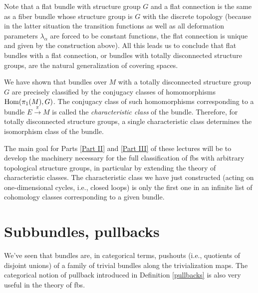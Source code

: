 \begin{example}
	Note that a flat bundle with structure group $G$ and a flat connection is the same as a fiber bundle whose structure group is $G$ with the discrete topology (because in the latter situation the transition functions as well as all deformation parameters $\lambda_\alpha$ are forced to be constant functions, the flat connection is unique and given by the construction above). All this leads us to conclude that flat bundles with a flat connection, or bundles with totally disconnected structure groups, are the natural generalization of covering spaces.
	
	We have shown that bundles over $M$ with a totally disconnected structure group $G$ are precisely classified by the conjugacy classes of homomorphisms $\operatorname{Hom}(\pi_1(M),G)$. The conjugacy class of such homomorphisms corresponding to a bundle $E\overset{\pi}{\to}M$ is called the \emph{characteristic class} of the bundle. Therefore, for totally disconnected structure groups, a single characteristic class determines the isomorphism class of the bundle.
	
	The main goal for Parts \ref{Part II} and \ref{Part III} of these lectures will be to develop the machinery necessary for the full classification of \glspl{fb} with arbitrary topological structure groups, in particular by extending the theory of characteristic classes. The characteristic class we have just constructed (acting on one-dimensional cycles, i.e., closed loops) is only the first one in an infinite list of cohomology classes corresponding to a given bundle.
\end{example}

\section{Subbundles, pullbacks}


We've seen that bundles are, in categorical terms, pushouts (i.e., quotients of disjoint unions) of a family of trivial bundles along the trivialization maps. The categorical notion of pullback introduced in Definition \ref{pullbacks} is also very useful in the theory of \glspl{fb}.

